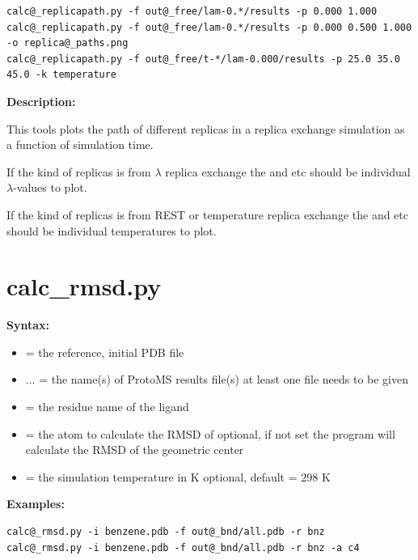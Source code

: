\documentclass[letterpaper,10pt,english]{manual}
\begin{document}
\begin{Verbatim}[commandchars=@\[\]]
calc@_replicapath.py -f out@_free/lam-0.*/results -p 0.000 1.000
calc@_replicapath.py -f out@_free/lam-0.*/results -p 0.000 0.500 1.000 -o replica@_paths.png
calc@_replicapath.py -f out@_free/t-*/lam-0.000/results -p 25.0 35.0 45.0 -k temperature
\end{Verbatim}

\textbf{Description:}

This tools plots the path of different replicas in a replica exchange simulation as a function of simulation time.

If the kind of replicas is from $\lambda$ replica exchange the  and  etc should be individual $\lambda$-values to plot.

If the kind of replicas is from REST or temperature replica exchange the  and  etc should be individual temperatures to plot.


\section{calc\_rmsd.py}

\textbf{Syntax:}

\begin{itemize}
\item {} 
 = the reference, initial PDB file

\item {} 
 ... = the name(s) of ProtoMS results file(s)
at least one file needs to be given

\item {} 
 = the residue name of the ligand

\item {} 
 = the atom to calculate the RMSD of
optional, if not set the program will calculate the RMSD of the geometric center

\item {} 
 = the simulation temperature in K
optional, default = 298 K

\end{itemize}

\textbf{Examples:}

\begin{Verbatim}[commandchars=@\[\]]
calc@_rmsd.py -i benzene.pdb -f out@_bnd/all.pdb -r bnz
calc@_rmsd.py -i benzene.pdb -f out@_bnd/all.pdb -r bnz -a c4
\end{Verbatim}
\end{document}
